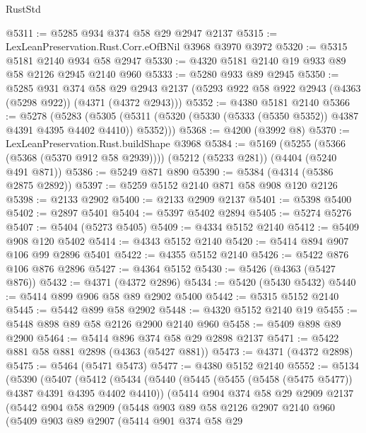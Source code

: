 \begin{lexlean}{RustStd}
\begin{coremodule}
@5311 := @5285 @934 @374 @58 @29 @2947 @2137
@5315 := LexLeanPreservation.Rust.Corr.eOfBNil @3968 @3970 @3972
@5320 := @5315 @5181 @2140 @934 @58 @2947
@5330 := @4320 @5181 @2140 @19 @933 @89 @58 @2126 @2945 @2140 @960
@5333 := @5280 @933 @89 @2945
@5350 := @5285
    @931
    @374
    @58
    @29
    @2943
    @2137
    (@5293 @922 @58 @922 @2943 (@4363 (@5298 @922)) (@4371 (@4372 @2943)))
@5352 := @4380 @5181 @2140
@5366 := @5278
    (@5283
      (@5305 (@5311 (@5320 (@5330 (@5333 (@5350 @5352)) @4387 @4391 @4395 @4402 @4410)) @5352)))
@5368 := @4200 (@3992 @8)
@5370 := LexLeanPreservation.Rust.buildShape @3968
@5384 := @5169
    (@5255 (@5366 (@5368 (@5370 @912 @58 @2939))))
    (@5212 (@5233 @281))
    (@4404 (@5240 @491 @871))
@5386 := @5249 @871 @890
@5390 := @5384 (@4314 (@5386 @2875 @2892))
@5397 := @5259 @5152 @2140 @871 @58 @908 @120 @2126
@5398 := @2133 @2902
@5400 := @2133 @2909 @2137
@5401 := @5398 @5400
@5402 := @2897 @5401
@5404 := @5397 @5402 @2894
@5405 := @5274 @5276
@5407 := @5404 (@5273 @5405)
@5409 := @4334 @5152 @2140
@5412 := @5409 @908 @120 @5402
@5414 := @4343 @5152 @2140
@5420 := @5414 @894 @907 @106 @99 @2896 @5401
@5422 := @4355 @5152 @2140
@5426 := @5422 @876 @106 @876 @2896
@5427 := @4364 @5152
@5430 := @5426 (@4363 (@5427 @876))
@5432 := @4371 (@4372 @2896)
@5434 := @5420 (@5430 @5432)
@5440 := @5414 @899 @906 @58 @89 @2902 @5400
@5442 := @5315 @5152 @2140
@5445 := @5442 @899 @58 @2902
@5448 := @4320 @5152 @2140 @19
@5455 := @5448 @898 @89 @58 @2126 @2900 @2140 @960
@5458 := @5409 @898 @89 @2900
@5464 := @5414 @896 @374 @58 @29 @2898 @2137
@5471 := @5422 @881 @58 @881 @2898 (@4363 (@5427 @881))
@5473 := @4371 (@4372 @2898)
@5475 := @5464 (@5471 @5473)
@5477 := @4380 @5152 @2140
@5552 := @5134
    (@5390
      (@5407
        (@5412
          (@5434
            (@5440
              (@5445 (@5455 (@5458 (@5475 @5477)) @4387 @4391 @4395 @4402 @4410))
              (@5414
                @904
                @374
                @58
                @29
                @2909
                @2137
                (@5442
                  @904
                  @58
                  @2909
                  (@5448
                    @903
                    @89
                    @58
                    @2126
                    @2907
                    @2140
                    @960
                    (@5409
                      @903
                      @89
                      @2907
                      (@5414
                        @901
                        @374
                        @58
                        @29

\end{coremodule}
\end{lexlean}
